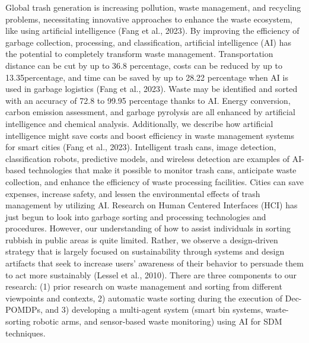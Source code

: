 \documentclass[a4paper,11pt,onecolumn]{article}
\begin{document}
Global trash generation is increasing pollution, waste management, and recycling problems, necessitating innovative approaches to enhance the waste ecosystem, like using artificial intelligence (Fang et al., 2023). By improving the efficiency of garbage collection, processing, and classification, artificial intelligence (AI) has the potential to completely transform waste management. Transportation distance can be cut by up to 36.8 percentage, costs can be reduced by up to 13.35percentage, and time can be saved by up to 28.22 percentage when AI is used in garbage logistics (Fang et al., 2023). Waste may be identified and sorted with an accuracy of 72.8 to 99.95 percentage thanks to AI. Energy conversion, carbon emission assessment, and garbage pyrolysis are all enhanced by artificial intelligence and chemical analysis. Additionally, we describe how artificial intelligence might save costs and boost efficiency in waste management systems for smart cities (Fang et al., 2023).\newline
Intelligent trash cans, image detection, classification robots, predictive models, and wireless detection are examples of AI-based technologies that make it possible to monitor trash cans, anticipate waste collection, and enhance the efficiency of waste processing facilities. Cities can save expenses, increase safety, and lessen the environmental effects of trash management by utilizing AI.\newline 
Research on Human Centered Interfaces (HCI) has just begun to look into garbage sorting and processing technologies and procedures. However, our understanding of how to assist individuals in sorting rubbish in public areas is quite limited. Rather, we observe a design-driven strategy that is largely focused on sustainability through systems and design artifacts that seek to increase users' awareness of their behavior to persuade them to act more sustainably (Lessel et al., 2010). There are three components to our research: (1) prior research on waste management and sorting from different viewpoints and contexts, 2) automatic waste sorting during the execution of Dec-POMDPs, and 3) developing a multi-agent system (smart bin systems, waste-sorting robotic arms, and sensor-based waste monitoring) using AI for SDM techniques.\newline \\
\end{document}
